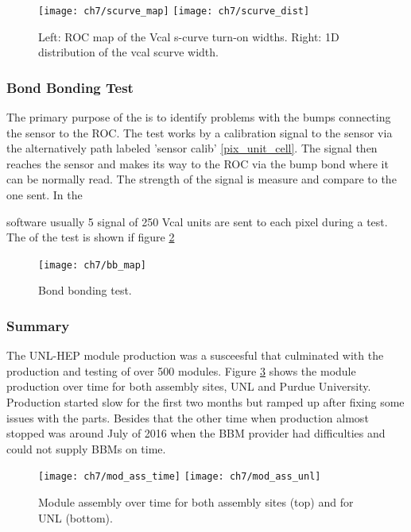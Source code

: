 \begin{figure}[!h]
  \centering
  \texttt{[image: ch7/scurve\_map]}
  \texttt{[image: ch7/scurve\_dist]}
  \caption[Scurve test]{Left: ROC map of the Vcal s-curve turn-on widths. Right: 1D distribution of the vcal scurve width.}\label{fig:vis_insp}
\end{figure}

\subsubsection{Bond Bonding Test}
{} The primary purpose of the  is to identify problems with the bumps connecting the sensor to the ROC. The test works by a calibration signal to the sensor via the alternatively path labeled 'sensor calib' \ref{pix_unit_cell}. The signal then reaches the sensor and makes its way to the ROC via the bump bond where it can be normally read. The strength of the signal is measure and compare to the one sent. In the { software usually 5 signal of 250 Vcal units are sent to each pixel during a  test. The {} of the test is shown if figure \ref{fig:bb_map}    

\begin{figure}[!h]
	\centering
	\texttt{[image: ch7/bb\_map]}
	\caption[Bond bonding test.]{Bond bonding test.}
	\label{fig:bb_map}
\end{figure}

\subsubsection{Summary}
The UNL-HEP module production was a susceesful {} that culminated with the production and testing of over 500 modules. Figure \ref{mod_ass_time} shows the module production over time for both assembly sites, UNL and Purdue University. Production started slow for the first two months but ramped up after fixing some issues with the parts. Besides that the other time when production almost stopped was around July of 2016 when the BBM provider had difficulties and could not supply BBMs on time. {}

\begin{figure}[ht]
	\centering
	\texttt{[image: ch7/mod\_ass\_time]}
	\texttt{[image: ch7/mod\_ass\_unl]}
	\caption[Module assembly over time.]{Module assembly over time for both assembly sites (top) and for UNL (bottom).}
	\label{mod_ass_time}
\end{figure}

}
